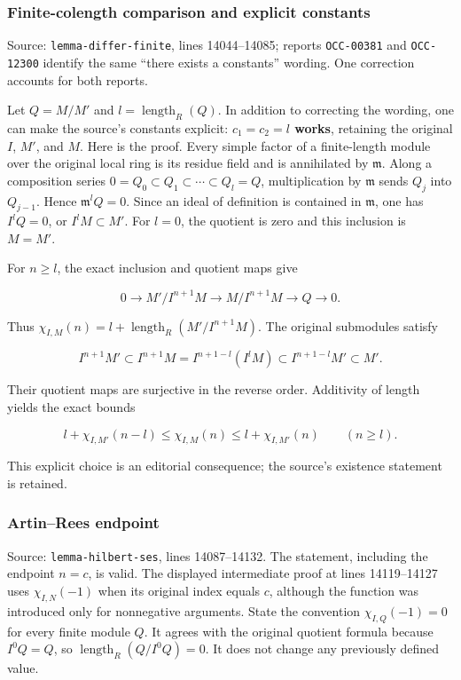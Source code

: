 \subsubsection{Finite-colength comparison and explicit constants}\label{algebra-proof-003-finite-colength-comparison-and-explicit-constants}

Source: \texttt{lemma-differ-finite}, lines 14044--14085; reports \texttt{OCC-00381} and \texttt{OCC-12300} identify the same ``there exists a constants'' wording. One correction accounts for both reports.

Let \(Q=M/M'\) and \(l=\operatorname{length}_R(Q)\). In addition to correcting the wording, one can make the source's constants explicit: \textbf{\(c_1=c_2=l\) works}, retaining the original \(I\), \(M'\), and \(M\). Here is the proof. Every simple factor of a finite-length module over the original local ring is its residue field and is annihilated by \(\mathfrak m\). Along a composition series \(0=Q_0\subset Q_1\subset\cdots\subset Q_l=Q\), multiplication by \(\mathfrak m\) sends \(Q_j\) into \(Q_{j-1}\). Hence \(\mathfrak m^lQ=0\). Since an ideal of definition is contained in \(\mathfrak m\), one has \(I^lQ=0\), or \(I^lM\subset M'\). For \(l=0\), the quotient is zero and this inclusion is \(M=M'\).

For \(n\geq l\), the exact inclusion and quotient maps give

\[
0\longrightarrow M'/I^{n+1}M\longrightarrow M/I^{n+1}M
\longrightarrow Q\longrightarrow0.
\]

Thus \(\chi_{I,M}(n)=l+\operatorname{length}_R(M'/I^{n+1}M)\). The original submodules satisfy

\[
I^{n+1}M'\subset I^{n+1}M
 =I^{n+1-l}(I^lM)\subset I^{n+1-l}M'\subset M'.
\]

Their quotient maps are surjective in the reverse order. Additivity of length yields the exact bounds

\[
l+\chi_{I,M'}(n-l)\leq\chi_{I,M}(n)
\leq l+\chi_{I,M'}(n)\qquad(n\geq l).
\]

This explicit choice is an editorial consequence; the source's existence statement is retained.

\subsubsection{Artin--Rees endpoint}\label{algebra-proof-003-artinrees-endpoint}

Source: \texttt{lemma-hilbert-ses}, lines 14087--14132. The statement, including the endpoint \(n=c\), is valid. The displayed intermediate proof at lines 14119--14127 uses \(\chi_{I,N}(-1)\) when its original index equals \(c\), although the function was introduced only for nonnegative arguments. State the convention \(\chi_{I,Q}(-1)=0\) for every finite module \(Q\). It agrees with the original quotient formula because \(I^0Q=Q\), so \(\operatorname{length}_R(Q/I^0Q)=0\). It does not change any previously defined value.

